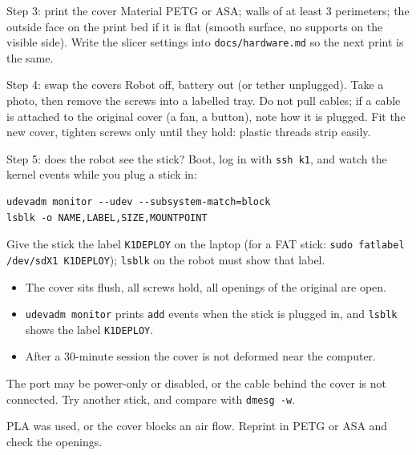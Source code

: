 \begin{stepbox}{Step 3: print the cover}
Material PETG or ASA; walls of at least $3$ perimeters; the outside face on the print bed if it is flat (smooth surface, no supports on the visible side). Write the slicer settings into \texttt{docs/hardware.md} so the next print is the same.
\end{stepbox}

\begin{stepbox}{Step 4: swap the covers}
Robot off, battery out (or tether unplugged). Take a photo, then remove the screws into a labelled tray. Do not pull cables; if a cable is attached to the original cover (a fan, a button), note how it is plugged. Fit the new cover, tighten screws only until they hold: plastic threads strip easily.
\end{stepbox}

\begin{stepbox}{Step 5: does the robot see the stick?}
Boot, log in with \verb!ssh k1!, and watch the kernel events while you plug a stick in:
\begin{verbatim}
udevadm monitor --udev --subsystem-match=block
lsblk -o NAME,LABEL,SIZE,MOUNTPOINT
\end{verbatim}
Give the stick the label \texttt{K1DEPLOY} on the laptop (for a FAT stick: \verb!sudo fatlabel /dev/sdX1 K1DEPLOY!); \texttt{lsblk} on the robot must show that label.
\end{stepbox}

\begin{checkbox}
\begin{itemize}[nosep]
  \item The cover sits flush, all screws hold, all openings of the original are open.
  \item \texttt{udevadm monitor} prints \texttt{add} events when the stick is plugged in, and \texttt{lsblk} shows the label \texttt{K1DEPLOY}.
  \item After a $30$-minute session the cover is not deformed near the computer.
\end{itemize}
\end{checkbox}

\begin{troublebox}
\begin{description}[leftmargin=0.6cm,nosep]
  \item[No events] The port may be power-only or disabled, or the cable behind the cover is not connected. Try another stick, and compare with \verb!dmesg -w!.
  \item[The cover warps] PLA was used, or the cover blocks an air flow. Reprint in PETG or ASA and check the openings.
\end{description}
\end{troublebox}

